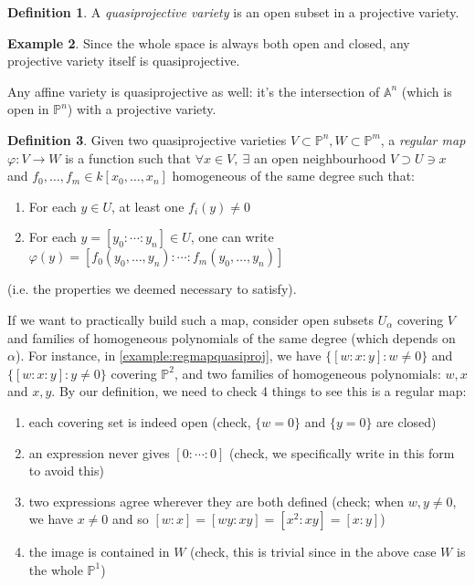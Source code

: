 \documentclass{article}
\newcommand{\A}{\mathbb{A}}
\newcommand{\p}{\mathbb{P}}
\theoremstyle{definition}
\newtheorem{defn}{Definition}[subsection]
\newtheorem{example}[defn]{Example}
\begin{document}
\begin{defn}
A \textit{quasiprojective variety} is an open subset in a projective variety.
\end{defn}
\begin{example}
Since the whole space is always both open and closed, any projective variety itself is quasiprojective.

Any affine variety is quasiprojective as well: it's the intersection of $\A^n$ (which is open in $\p^n$) with a projective variety.
\end{example}

\begin{defn}
Given two quasiprojective varieties $V\subset\p^n,W\subset\p^m$, a \textit{regular map} $\varphi:V\rightarrow W$ is a function such that $\forall x\in V,\ \exists$ an open neighbourhood $V\supset U\ni x$ and $f_0,\ldots,f_m\in k[x_0,\ldots,x_n]$ homogeneous of the same degree such that:
\begin{enumerate}
\item For each $y\in U$, at least one $f_i(y)\neq 0$
\item For each $y=[y_0:\cdots:y_n]\in U$, one can write $\varphi(y)=\left[f_0(y_0,\ldots,y_n):\cdots:f_m(y_0,\ldots,y_n)\right]$
\end{enumerate}
(i.e. the properties we deemed necessary to satisfy).
\end{defn}
If we want to practically build such a map, consider open subsets $U_\alpha$ covering $V$ and families of homogeneous polynomials of the same degree (which depends on $\alpha$). For instance, in \ref{example:regmapquasiproj}, we have $\{[w:x:y]:w\neq 0\}$ and $\{[w:x:y]:y\neq 0\}$ covering $\p^2$, and two families of homogeneous polynomials: $w,x$ and $x,y$. By our definition, we need to check 4 things to see this is a regular map:
\begin{enumerate}
\item each covering set is indeed open (check, $\{w=0\}$ and $\{y=0\}$ are closed)
\item an expression never gives $[0:\cdots:0]$ (check, we specifically write in this form to avoid this)
\item two expressions agree wherever they are both defined (check; when $w,y\neq 0$, we have $x\neq 0$ and so $[w:x]=[wy:xy]=[x^2:xy]=[x:y]$)
\item the image is contained in $W$ (check, this is trivial since in the above case $W$ is the whole $\p^1$)
\end{enumerate}
\end{document}
